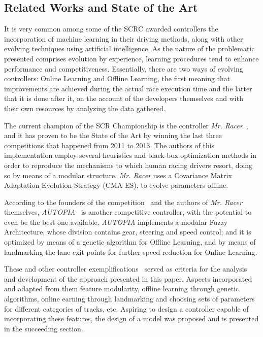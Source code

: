 \subsection{Related Works and State of the Art} \label{subsec:Related}
	
	It is very common among some of the SCRC awarded controllers the incorporation of machine learning in their driving methods, along with other evolving techniques using artificial intelligence. As the nature of the problematic presented comprises evolution by experience, learning procedures tend to enhance performance and competitiveness. Essentially, there are two ways of evolving controllers: Online Learning and Offline Learning, the first meaning that improvements are achieved during the actual race execution time and the latter that it is done after it, on the account of the developers themselves and with their own resources by analyzing the data gathered.
	
	The current champion of the SCR Championship is the controller \emph{Mr. Racer}~\cite{MrRacer}, and it has proven to be the State of the Art by winning the last three competitions that happened from 2011 to 2013. The authors of this implementation employ several heuristics and black-box optimization methods in order to reproduce the mechanisms to which human racing drivers resort, doing so by means of a modular structure. \emph{Mr. Racer} uses a Covariance Matrix Adaptation Evolution Strategy (CMA-ES), to evolve parameters offline.
	
	According to the founders of the competition~\cite{SCRC} and the authors of \emph{Mr. Racer} themselves, \emph{AUTOPIA}~\cite{AUTOPIA} is another competitive controller, with the potential to even be the best one available. \emph{AUTOPIA} implements a modular Fuzzy Architecture, whose division contains gear, steering and speed control; and it is optimized by means of a genetic algorithm for Offline Learning, and by means of landmarking the lane exit points for further speed reduction for Online Learning.
	
	These and other controller exemplifications~\cite{SCRC} served as criteria for the analysis and development of the approach presented in this paper. Aspects incorporated and adapted from them feature modularity, offline learning through genetic algorithms, online earning through landmarking and choosing sets of parameters for different categories of tracks, etc. Aspiring to design a controller capable of incorporating these features, the design of a model was proposed and is presented in the succeeding section.
	